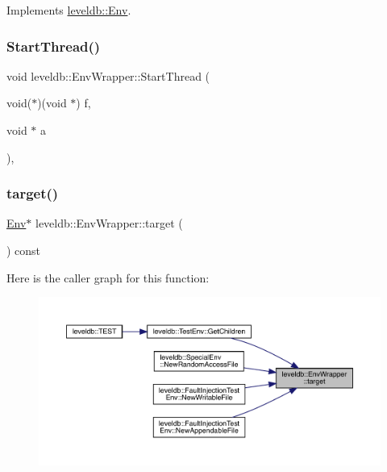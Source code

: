 Implements \mbox{\hyperlink{classleveldb_1_1_env_a43ad838cfb08db3d9e2197800cd33312}{leveldb\+::\+Env}}.

\mbox{\label{classleveldb_1_1_env_wrapper_a0e59526c61ba50f60e11480e7e7b44c0}} 
\subsubsection{\texorpdfstring{StartThread()}{StartThread()}}
{\footnotesize\ttfamily void leveldb\+::\+Env\+Wrapper\+::\+Start\+Thread (\begin{DoxyParamCaption}\item[{void($\ast$)(void $\ast$)}]{f,  }\item[{void $\ast$}]{a }\end{DoxyParamCaption})\hspace{0.3cm}{\ttfamily [inline]}, {\ttfamily [override]}}

\mbox{\label{classleveldb_1_1_env_wrapper_ac9bdbc7110de3bdbc42c04ca65f68de6}} 
\subsubsection{\texorpdfstring{target()}{target()}}
{\footnotesize\ttfamily \mbox{\hyperlink{classleveldb_1_1_env}{Env}}$\ast$ leveldb\+::\+Env\+Wrapper\+::target (\begin{DoxyParamCaption}{ }\end{DoxyParamCaption}) const\hspace{0.3cm}{\ttfamily [inline]}}

Here is the caller graph for this function\+:
\nopagebreak
\begin{figure}[H]
\begin{center}
\leavevmode
\includegraphics[width=350pt]{classleveldb_1_1_env_wrapper_ac9bdbc7110de3bdbc42c04ca65f68de6_icgraph}
\end{center}
\end{figure}
\mbox{\label{classleveldb_1_1_env_wrapper_ab83a07da23586f1b61e709b1512a2807}} 

